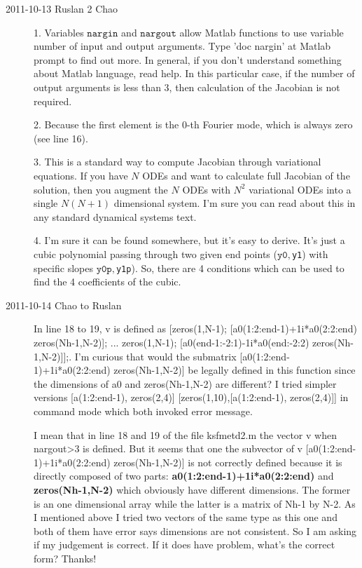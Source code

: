 \begin{description}
\item[2011-10-13 Ruslan 2 Chao]

1. Variables $\texttt{nargin}$ and $\texttt{nargout}$ allow Matlab functions to use variable number of input and output arguments.  Type 'doc nargin' at Matlab prompt to find out more.  In general, if you don't understand something about Matlab language, read help.  In this particular case, if the number of output arguments is less than 3, then calculation of the Jacobian is not required.

2. Because the first element is the 0-th Fourier mode, which is always zero (see line 16).

3. This is a standard way to compute Jacobian through variational equations.  If you have $N$ ODEs and want to calculate full Jacobian of the solution, then you augment the $N$ ODEs with $N^2$ variational ODEs into a single $N(N+1)$ dimensional system.  I'm sure you can read about this in any standard dynamical systems text.

4. I'm sure it can be found somewhere, but it's easy to derive.  It's just a cubic polynomial passing through two given end points ($\texttt{y0}, $\texttt{y1}) with specific slopes $\texttt{y0p}, $\texttt{y1p}).  So, there are 4 conditions which can be used to find the 4 coefficients of the cubic.

\item[2011-10-14 Chao to Ruslan]
In line 18 to 19, v is defined as [zeros(1,N-1); [a0(1:2:end-1)+1i*a0(2:2:end) zeros(Nh-1,N-2)]; ...
zeros(1,N-1); [a0(end-1:-2:1)-1i*a0(end:-2:2) zeros(Nh-1,N-2)]];. I'm curious that would the submatrix [a0(1:2:end-1)+1i*a0(2:2:end) zeros(Nh-1,N-2)] be legally defined in this function since the dimensions of a0 and zeros(Nh-1,N-2) are different? I tried simpler versions [a(1:2:end-1), zeros(2,4)] [zeros(1,10),[a(1:2:end-1), zeros(2,4)]] in command mode which both invoked error message.

I mean that in line 18 and 19 of the file ksfmetd2.m the vector v when nargout>3 is defined. But it seems that one the subvector of v [a0(1:2:end-1)+1i*a0(2:2:end) zeros(Nh-1,N-2)] is not correctly defined because it is directly composed of two parts: \textbf{a0(1:2:end-1)+1i*a0(2:2:end)} and \textbf{zeros(Nh-1,N-2)} which obviously have different dimensions. The former is an one dimensional array while the latter is a matrix of Nh-1 by N-2. As I mentioned above I tried two vectors of the same type as this one and both of them have error says dimensions are not consistent. So I am asking if my judgement is correct. If it does have problem, what's the correct form? Thanks!


\end{description}

